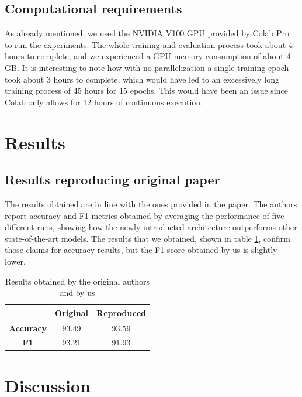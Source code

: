 \subsection{Computational requirements}
As already mentioned, we used the NVIDIA V100 GPU provided by Colab Pro to run the experiments. The whole training and evaluation process took about 4 hours to complete, and we experienced a GPU memory consumption of about 4 GB. It is interesting to note how with no parallelization a single training epoch took about 3 hours to complete, which would have led to an excessively long training process of 45 hours for 15 epochs. This would have been an issue since Colab only allows for 12 hours of continuous execution.

\section{Results}
\label{sec:results}

\subsection{Results reproducing original paper}
The results obtained are in line with the ones provided in the paper. The authors report accuracy and F1 metrics obtained by averaging the performance of five different runs, showing how the newly introducted architecture outperforms other state-of-the-art models. The results that we obtained, shown in table \ref{tab:results}, confirm those claims for accuracy results, but the F1 score obtained by us is slightly lower. 

\begin{table}
    \caption{Results obtained by the original authors and by us}
    \label{tab:results}
    \centering
    \begin{tabular}{| c|c c|}
        \hline
         & \textbf{Original} & \textbf{Reproduced} \\
        \hline
         \textbf{Accuracy} & 93.49 & 93.59 \\
        \hline
        \textbf{F1} & 93.21 & 91.93 \\
        \hline
    \end{tabular}
\end{table}



\section{Discussion}

